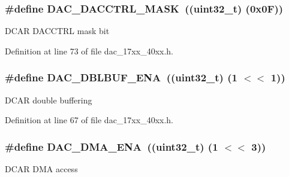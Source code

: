 \subsubsection[{\texorpdfstring{D\+A\+C\+\_\+\+D\+A\+C\+C\+T\+R\+L\+\_\+\+M\+A\+SK}{DAC_DACCTRL_MASK}}]{\setlength{\rightskip}{0pt plus 5cm}\#define D\+A\+C\+\_\+\+D\+A\+C\+C\+T\+R\+L\+\_\+\+M\+A\+SK~((uint32\+\_\+t) (0x0\+F))}\hypertarget{group__DAC__17XX__40XX_ga3d9ce4bc003bffdea6fb98da402d2318}{}\label{group__DAC__17XX__40XX_ga3d9ce4bc003bffdea6fb98da402d2318}
D\+C\+AR D\+A\+C\+C\+T\+RL mask bit 

Definition at line 73 of file dac\+\_\+17xx\+\_\+40xx.\+h.

\subsubsection[{\texorpdfstring{D\+A\+C\+\_\+\+D\+B\+L\+B\+U\+F\+\_\+\+E\+NA}{DAC_DBLBUF_ENA}}]{\setlength{\rightskip}{0pt plus 5cm}\#define D\+A\+C\+\_\+\+D\+B\+L\+B\+U\+F\+\_\+\+E\+NA~((uint32\+\_\+t) (1 $<$$<$ 1))}\hypertarget{group__DAC__17XX__40XX_gaa52ab08dc967f09afb7fcbb15ef1b1c0}{}\label{group__DAC__17XX__40XX_gaa52ab08dc967f09afb7fcbb15ef1b1c0}
D\+C\+AR double buffering 

Definition at line 67 of file dac\+\_\+17xx\+\_\+40xx.\+h.

\subsubsection[{\texorpdfstring{D\+A\+C\+\_\+\+D\+M\+A\+\_\+\+E\+NA}{DAC_DMA_ENA}}]{\setlength{\rightskip}{0pt plus 5cm}\#define D\+A\+C\+\_\+\+D\+M\+A\+\_\+\+E\+NA~((uint32\+\_\+t) (1 $<$$<$ 3))}\hypertarget{group__DAC__17XX__40XX_gab00cf8cef7eee4ff812d53ae52e4b38d}{}\label{group__DAC__17XX__40XX_gab00cf8cef7eee4ff812d53ae52e4b38d}
D\+C\+AR D\+MA access 

